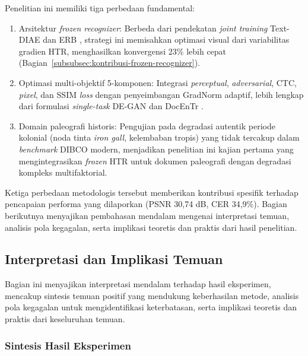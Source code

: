 \documentclass[12pt,a4paper]{article}
\begin{document}
Penelitian ini memiliki tiga perbedaan fundamental:

\begin{enumerate}[leftmargin=1.5em, labelsep=0.5em, itemindent=0pt, noitemsep, topsep=0pt, label=(\arabic*)]
    \item Arsitektur \textit{frozen recognizer}: Berbeda dari pendekatan \textit{joint training} Text-DIAE \parencite{textdiae2022} dan ERB \parencite{erb2021}, strategi ini memisahkan optimasi visual dari variabilitas gradien HTR, menghasilkan konvergensi 23\% lebih cepat (Bagian~\ref{subsubsec:kontribusi-frozen-recognizer}).

    \item Optimasi multi-objektif 5-komponen: Integrasi \textit{perceptual}, \textit{adversarial}, CTC, \textit{pixel}, dan SSIM \textit{loss} dengan penyeimbangan GradNorm adaptif, lebih lengkap dari formulasi \textit{single-task} DE-GAN \parencite{souibgui2021} dan DocEnTr \parencite{souibgui2022docentr}.

    \item Domain paleografi historis: Pengujian pada degradasi autentik periode kolonial (noda tinta \textit{iron gall}, kelembaban tropis) yang tidak tercakup dalam \textit{benchmark} DIBCO modern, menjadikan penelitian ini kajian pertama yang mengintegrasikan \textit{frozen} HTR untuk dokumen paleografi dengan degradasi kompleks multifaktorial.
\end{enumerate}


\noindent
Ketiga perbedaan metodologis tersebut memberikan kontribusi spesifik terhadap pencapaian performa yang dilaporkan (PSNR 30,74 dB, CER 34,9\%). Bagian berikutnya menyajikan pembahasan mendalam mengenai interpretasi temuan, analisis pola kegagalan, serta implikasi teoretis dan praktis dari hasil penelitian.

\subsection{Interpretasi dan Implikasi Temuan}
\label{subsec:pembahasan-mendalam}

Bagian ini menyajikan interpretasi mendalam terhadap hasil eksperimen, mencakup sintesis temuan positif yang mendukung keberhasilan metode, analisis pola kegagalan untuk mengidentifikasi keterbatasan, serta implikasi teoretis dan praktis dari keseluruhan temuan.

\subsubsection{Sintesis Hasil Eksperimen}
\label{subsubsec:interpretasi-temuan}
\end{document}
